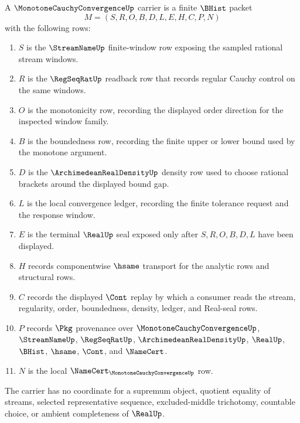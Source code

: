 \begin{definition}
\label{def:monotone-cauchy-convergence-carrier}
A $\MonotoneCauchyConvergenceUp$ carrier is a finite $\BHist$ packet
$$
M=(S,R,O,B,D,L,E,H,C,P,N)
$$
with the following rows:
\begin{enumerate}
\item $S$ is the $\StreamNameUp$ finite-window row exposing the sampled rational stream windows.
\item $R$ is the $\RegSeqRatUp$ readback row that records regular Cauchy control on the same windows.
\item $O$ is the monotonicity row, recording the displayed order direction for the inspected window family.
\item $B$ is the boundedness row, recording the finite upper or lower bound used by the monotone argument.
\item $D$ is the $\ArchimedeanRealDensityUp$ density row used to choose rational brackets around the displayed bound gap.
\item $L$ is the local convergence ledger, recording the finite tolerance request and the response window.
\item $E$ is the terminal $\RealUp$ seal exposed only after $S,R,O,B,D,L$ have been displayed.
\item $H$ records componentwise $\hsame$ transport for the analytic rows and structural rows.
\item $C$ records the displayed $\Cont$ replay by which a consumer reads the stream, regularity, order, boundedness, density, ledger, and Real-seal rows.
\item $P$ records $\Pkg$ provenance over $\MonotoneCauchyConvergenceUp$, $\StreamNameUp$, $\RegSeqRatUp$, $\ArchimedeanRealDensityUp$, $\RealUp$, $\BHist$, $\hsame$, $\Cont$, and $\NameCert$.
\item $N$ is the local $\NameCert_{\MonotoneCauchyConvergenceUp}$ row.
\end{enumerate}
The carrier has no coordinate for a supremum object, quotient equality of streams, selected representative sequence, excluded-middle trichotomy, countable choice, or ambient completeness of $\RealUp$.
\end{definition}

